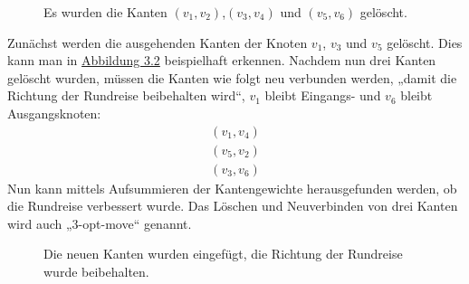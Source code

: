 \begin{figure}[bh]
\label{fig:3opt_2}
\centering
{}
\caption[Löschen von drei Kanten in 3-opt]{Es wurden die Kanten
$(v_1,v_2)$,$(v_3,v_4)$ und $(v_5,v_6)$ gelöscht.}
\end{figure}
\noindent
Zunächst werden die ausgehenden Kanten der Knoten $v_1$, 
  $v_3$ und $v_5$ gelöscht. Dies kann man in
  \hyperref[fig:3opt_2]{Abbildung 3.2} beispielhaft
erkennen. Nachdem nun drei Kanten gelöscht wurden, müssen die Kanten wie
folgt neu verbunden werden, „damit die Richtung der Rundreise beibehalten
wird“\cite{nagata}, $v_1$ bleibt Eingangs- und $v_6$ bleibt
Ausgangsknoten: 
\begin{align*}
  (v_1, v_4)\\
  (v_5, v_2)\\
  (v_3, v_6)
\end{align*}
Nun kann mittels
Aufsummieren der Kantengewichte herausgefunden werden, ob die Rundreise
verbessert wurde. Das Löschen und Neuverbinden von drei Kanten wird
auch „3-opt-move“ genannt.


\begin{figure}[bh]
\centering
{}
\caption[Neues Verbinden der Kanten in 3-opt]{Die neuen Kanten wurden
eingefügt, die Richtung der Rundreise wurde beibehalten.}
\end{figure}

